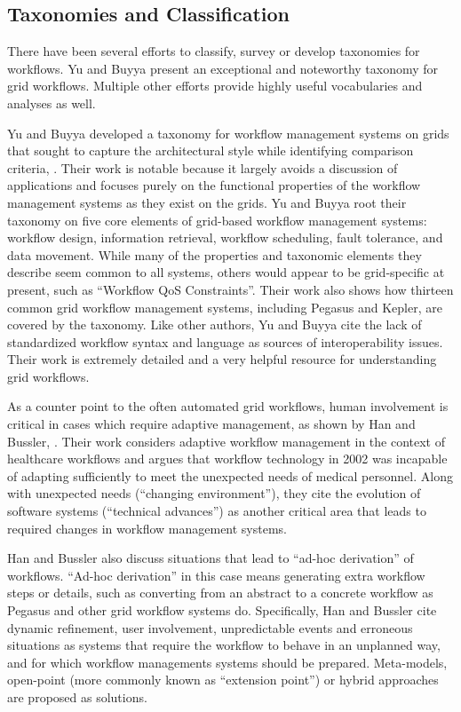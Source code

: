 \subsection{Taxonomies and
Classification}\label{taxonomies-and-classification}
There have been several efforts to classify, survey or develop taxonomies
for workflows. Yu and Buyya present an exceptional and noteworthy taxonomy for grid
workflows. Multiple other efforts provide highly useful vocabularies and analyses as
well.

Yu and Buyya developed a taxonomy for workflow management systems on
grids that sought to capture the architectural style while identifying
comparison criteria, \cite{yu_taxonomy_2005}. Their work is notable because it
largely avoids a discussion of applications and focuses purely on the
functional properties of the workflow management systems as they exist
on the grids. Yu and Buyya root their taxonomy on five core elements of
grid-based workflow management systems: workflow design, information
retrieval, workflow scheduling, fault tolerance, and data movement.
While many of the properties and taxonomic elements they describe seem
common to all systems, others would appear to be grid-specific at present, such
as ``Workflow QoS Constraints''. Their work also shows how thirteen common grid
workflow management systems, including Pegasus and Kepler, are covered by the
taxonomy. Like other authors, Yu and Buyya cite the lack of standardized
workflow syntax and language as sources of interoperability issues. Their work is extremely
detailed and a very helpful resource for understanding grid workflows.

As a counter point to the often automated grid workflows, human involvement is 
critical in cases which require adaptive
management, as shown by Han and Bussler, \cite{han_taxonomy_1998}. Their work
considers adaptive workflow management in the context of healthcare
workflows and argues that workflow technology in 2002 was incapable of
adapting sufficiently to meet the unexpected needs of medical personnel.
Along with unexpected needs (``changing environment''), they cite the
evolution of software systems (``technical advances'') as another
critical area that leads to required changes in workflow management
systems.

Han and Bussler also discuss situations that lead to ``ad-hoc derivation'' of
workflows. ``Ad-hoc derivation'' in this case means generating extra
workflow steps or details, such as converting from an abstract to a
concrete workflow as Pegasus and other grid workflow systems do.
Specifically, Han and Bussler cite dynamic refinement, user involvement,
unpredictable events and erroneous situations as systems that require
the workflow to behave in an unplanned way, and for which
workflow managements systems should be prepared. Meta-models, open-point
(more commonly known as ``extension point'') or hybrid approaches are
proposed as solutions.

